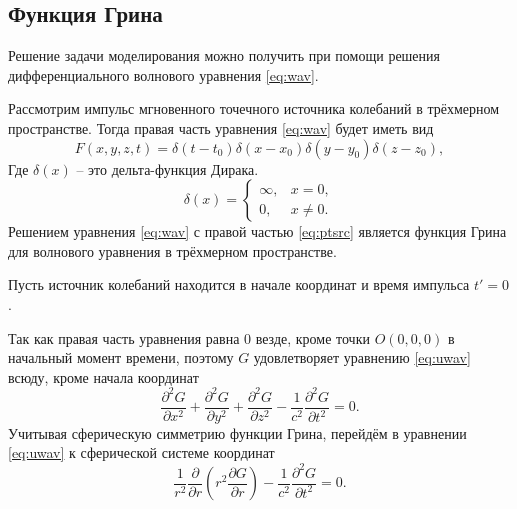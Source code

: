 \documentclass[a4paper, fontsize=14pt]{article}
\begin{document}

	\subsection{Функция Грина} 
		Решение задачи моделирования можно получить при помощи решения
	дифференциального волнового уравнения  \eqref{eq:wav}.

	Рассмотрим импульс мгновенного точечного источника колебаний в трёхмерном пространстве.
	Тогда правая часть уравнения \eqref{eq:wav} будет иметь вид \cite{zhdanov1988}
	\begin{equation}
		F(x,y,z,t) = \delta(t-t_0)\delta(x-x_0)\delta(y-y_0)\delta(z-z_0),
		\label{eq:ptsrc}
	\end{equation}
	Где $\delta(x)$ -- это дельта-функция Дирака.
	\begin{equation}
		\delta(x)=\begin{cases}
			\infty,&x=0,\\
			0,&x\neq 0.
		\end{cases}
		\label{eq:deltadef}
	\end{equation}	
	Решением уравнения \eqref{eq:wav} с правой частью \eqref{eq:ptsrc} является функция
	Грина для волнового уравнения в трёхмерном пространстве.
	
	Пусть источник колебаний находится в начале координат и время импульса $t' = 0$. 
	
	Так как правая часть уравнения равна 0 везде, кроме точки $O(0,0,0)$ в начальный момент времени, поэтому 
	$G$ удовлетворяет уравнению \eqref{eq:uwav} всюду, кроме начала координат
	\begin{equation}
		\frac{\partial^2 G}{\partial x^2} + \frac{\partial^2 G}{\partial y^2} +
		\frac{\partial^2 G}{\partial z^2} - \frac{1}{c^2} \frac{\partial^2 G}{\partial
			t^2} = 0.
		\label{eq:uwav}
	\end{equation}
	Учитывая сферическую симметрию функции Грина, перейдём в уравнении \eqref{eq:uwav} к сферической системе координат
	\begin{equation}
		\frac{1}{r^2}\frac{\partial}{\partial r}\left( r^2 \frac{\partial G}{\partial r} \right)- \frac{1}{c^2} \frac{\partial^2 G}{\partial
			t^2} = 0.
		\label{eq:uswav}
	\end{equation}
\end{document}
